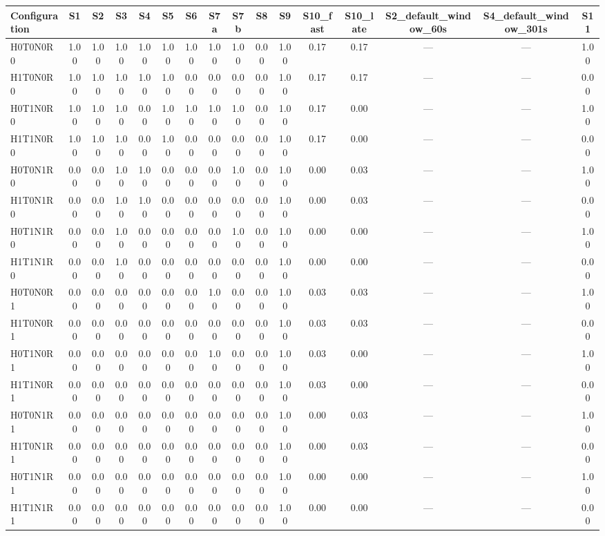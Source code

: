 \begin{tabular}{lccccccccccccccc}
\toprule
Configuration & S1 & S2 & S3 & S4 & S5 & S6 & S7a & S7b & S8 & S9 & S10_fast & S10_late & S2_default_window_60s & S4_default_window_301s & S11 \\
\midrule
H0T0N0R0 & 1.00 & 1.00 & 1.00 & 1.00 & 1.00 & 1.00 & 1.00 & 1.00 & 0.00 & 1.00 & 0.17 & 0.17 & --- & --- & 1.00 \\
H1T0N0R0 & 1.00 & 1.00 & 1.00 & 1.00 & 1.00 & 0.00 & 0.00 & 0.00 & 0.00 & 1.00 & 0.17 & 0.17 & --- & --- & 0.00 \\
H0T1N0R0 & 1.00 & 1.00 & 1.00 & 0.00 & 1.00 & 1.00 & 1.00 & 1.00 & 0.00 & 1.00 & 0.17 & 0.00 & --- & --- & 1.00 \\
H1T1N0R0 & 1.00 & 1.00 & 1.00 & 0.00 & 1.00 & 0.00 & 0.00 & 0.00 & 0.00 & 1.00 & 0.17 & 0.00 & --- & --- & 0.00 \\
H0T0N1R0 & 0.00 & 0.00 & 1.00 & 1.00 & 0.00 & 0.00 & 0.00 & 1.00 & 0.00 & 1.00 & 0.00 & 0.03 & --- & --- & 1.00 \\
H1T0N1R0 & 0.00 & 0.00 & 1.00 & 1.00 & 0.00 & 0.00 & 0.00 & 0.00 & 0.00 & 1.00 & 0.00 & 0.03 & --- & --- & 0.00 \\
H0T1N1R0 & 0.00 & 0.00 & 1.00 & 0.00 & 0.00 & 0.00 & 0.00 & 1.00 & 0.00 & 1.00 & 0.00 & 0.00 & --- & --- & 1.00 \\
H1T1N1R0 & 0.00 & 0.00 & 1.00 & 0.00 & 0.00 & 0.00 & 0.00 & 0.00 & 0.00 & 1.00 & 0.00 & 0.00 & --- & --- & 0.00 \\
H0T0N0R1 & 0.00 & 0.00 & 0.00 & 0.00 & 0.00 & 0.00 & 1.00 & 0.00 & 0.00 & 1.00 & 0.03 & 0.03 & --- & --- & 1.00 \\
H1T0N0R1 & 0.00 & 0.00 & 0.00 & 0.00 & 0.00 & 0.00 & 0.00 & 0.00 & 0.00 & 1.00 & 0.03 & 0.03 & --- & --- & 0.00 \\
H0T1N0R1 & 0.00 & 0.00 & 0.00 & 0.00 & 0.00 & 0.00 & 1.00 & 0.00 & 0.00 & 1.00 & 0.03 & 0.00 & --- & --- & 1.00 \\
H1T1N0R1 & 0.00 & 0.00 & 0.00 & 0.00 & 0.00 & 0.00 & 0.00 & 0.00 & 0.00 & 1.00 & 0.03 & 0.00 & --- & --- & 0.00 \\
H0T0N1R1 & 0.00 & 0.00 & 0.00 & 0.00 & 0.00 & 0.00 & 0.00 & 0.00 & 0.00 & 1.00 & 0.00 & 0.03 & --- & --- & 1.00 \\
H1T0N1R1 & 0.00 & 0.00 & 0.00 & 0.00 & 0.00 & 0.00 & 0.00 & 0.00 & 0.00 & 1.00 & 0.00 & 0.03 & --- & --- & 0.00 \\
H0T1N1R1 & 0.00 & 0.00 & 0.00 & 0.00 & 0.00 & 0.00 & 0.00 & 0.00 & 0.00 & 1.00 & 0.00 & 0.00 & --- & --- & 1.00 \\
H1T1N1R1 & 0.00 & 0.00 & 0.00 & 0.00 & 0.00 & 0.00 & 0.00 & 0.00 & 0.00 & 1.00 & 0.00 & 0.00 & --- & --- & 0.00 \\
\bottomrule
\end{tabular}
